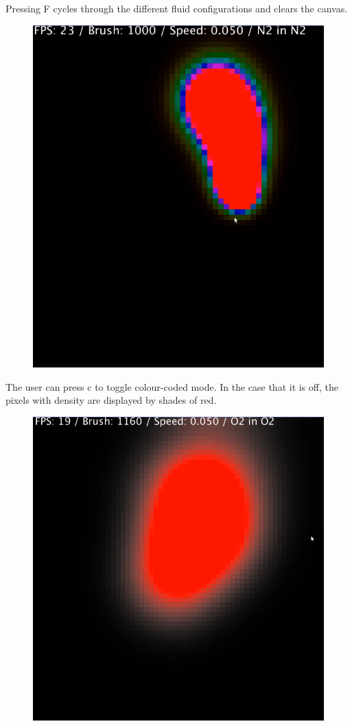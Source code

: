 \documentclass[12pt,a4paper]{book}
\begin{document}
\pagebreak
Pressing F cycles through the different fluid configurations and clears the canvas.

\begin{figure}[H]
	\includegraphics[scale=0.5]{pics/11.png}
\end{figure}

\pagebreak
The user can press c to toggle colour-coded mode. In the case that it is off, the pixels with density are displayed by shades of red.

\begin{figure}[H]
	\includegraphics[scale=0.5]{pics/12.png}
\end{figure}
\end{document}
